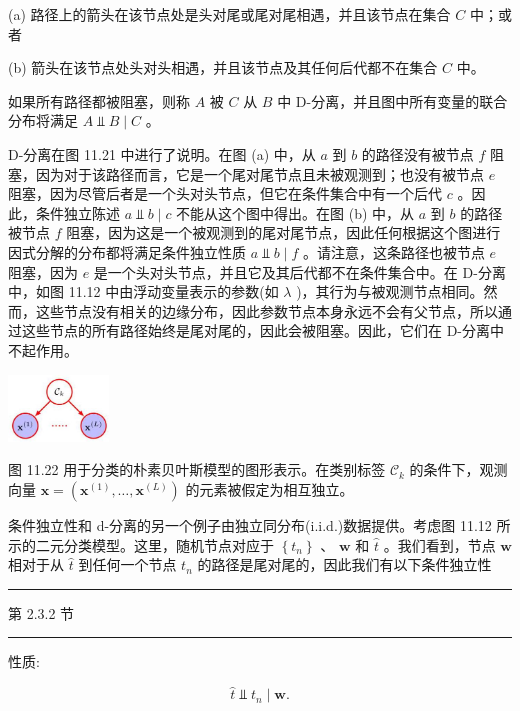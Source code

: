 \documentclass[10pt]{article}
\newcommand{\HRule}{\begin{center}\rule{0.9\linewidth}{0.2mm}\end{center}}
\begin{document}
(a) 路径上的箭头在该节点处是头对尾或尾对尾相遇，并且该节点在集合 \(C\) 中；或者

(b) 箭头在该节点处头对头相遇，并且该节点及其任何后代都不在集合 \(C\) 中。

如果所有路径都被阻塞，则称 \(A\) 被 \(C\) 从 \(B\) 中 D-分离，并且图中所有变量的联合分布将满足 \(A ⫫ B \mid  C\) 。

D-分离在图 11.21 中进行了说明。在图 (a) 中，从 \(a\) 到 \(b\) 的路径没有被节点 \(f\) 阻塞，因为对于该路径而言，它是一个尾对尾节点且未被观测到；也没有被节点 \(e\) 阻塞，因为尽管后者是一个头对头节点，但它在条件集合中有一个后代 \(c\) 。因此，条件独立陈述 \(a ⫫ b \mid  c\) 不能从这个图中得出。在图 (b) 中，从 \(a\) 到 \(b\) 的路径被节点 \(f\) 阻塞，因为这是一个被观测到的尾对尾节点，因此任何根据这个图进行因式分解的分布都将满足条件独立性质 \(a ⫫ b \mid  f\) 。请注意，这条路径也被节点 \(e\) 阻塞，因为 \(e\) 是一个头对头节点，并且它及其后代都不在条件集合中。在 D-分离中，如图 11.12 中由浮动变量表示的参数(如 \(\lambda\) )，其行为与被观测节点相同。然而，这些节点没有相关的边缘分布，因此参数节点本身永远不会有父节点，所以通过这些节点的所有路径始终是尾对尾的，因此会被阻塞。因此，它们在 D-分离中不起作用。

\begin{center}
\includegraphics[max width=0.2\textwidth]{images/0194e279-9b28-703a-88f4-c3ac21e2010d_363_1261_346_292_195_0.jpg}
\end{center}
\hspace*{3em} 

图 11.22 用于分类的朴素贝叶斯模型的图形表示。在类别标签 \({\mathcal{C}}_{k}\) 的条件下，观测向量 \(\mathbf{x} = \left( {{\mathbf{x}}^{\left( 1\right) },\ldots ,{\mathbf{x}}^{\left( L\right) }}\right)\) 的元素被假定为相互独立。

条件独立性和 d-分离的另一个例子由独立同分布(i.i.d.)数据提供。考虑图 11.12 所示的二元分类模型。这里，随机节点对应于 \(\left\{  {t}_{n}\right\}\) 、 \(\mathbf{w}\) 和 \(\widehat{t}\) 。我们看到，节点 \(\mathbf{w}\) 相对于从 \(\widehat{t}\) 到任何一个节点 \({t}_{n}\) 的路径是尾对尾的，因此我们有以下条件独立性

\HRule

第 2.3.2 节

\HRule

性质:

\[
\widehat{t} ⫫ {t}_{n} \mid  \mathbf{w}. \tag{11.36}
\]
\end{document}
